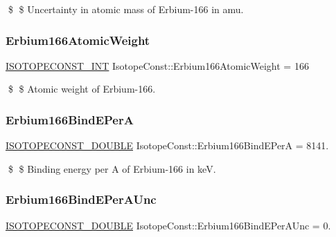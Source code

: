 \$ \$ Uncertainty in atomic mass of Erbium-\/166 in amu. \mbox{\label{group___isotope_const-_erbium-_er166_ga8fb1ef5299fd2909bfe9fede91c3a0c9}} 
\subsubsection{\texorpdfstring{Erbium166\+Atomic\+Weight}{Erbium166AtomicWeight}}
{\footnotesize\ttfamily \mbox{\hyperlink{group___isotope_const-_macros_ga5f18360b3e99483a35c32d789e62621c}{I\+S\+O\+T\+O\+P\+E\+C\+O\+N\+S\+T\+\_\+\+I\+NT}} Isotope\+Const\+::\+Erbium166\+Atomic\+Weight = 166}

\$ \$ Atomic weight of Erbium-\/166. \mbox{\label{group___isotope_const-_erbium-_er166_gacd64d0ea745dfdd40eb74ee2764c8688}} 
\subsubsection{\texorpdfstring{Erbium166\+Bind\+E\+PerA}{Erbium166BindEPerA}}
{\footnotesize\ttfamily \mbox{\hyperlink{group___isotope_const-_macros_ga8f45a7272ce02c0b4c65c44636ed719a}{I\+S\+O\+T\+O\+P\+E\+C\+O\+N\+S\+T\+\_\+\+D\+O\+U\+B\+LE}} Isotope\+Const\+::\+Erbium166\+Bind\+E\+PerA = 8141.}

\$ \$ Binding energy per A of Erbium-\/166 in keV. \mbox{\label{group___isotope_const-_erbium-_er166_ga42ca8eca0fe8b4b1a96c4f6c265a15d1}} 
\subsubsection{\texorpdfstring{Erbium166\+Bind\+E\+Per\+A\+Unc}{Erbium166BindEPerAUnc}}
{\footnotesize\ttfamily \mbox{\hyperlink{group___isotope_const-_macros_ga8f45a7272ce02c0b4c65c44636ed719a}{I\+S\+O\+T\+O\+P\+E\+C\+O\+N\+S\+T\+\_\+\+D\+O\+U\+B\+LE}} Isotope\+Const\+::\+Erbium166\+Bind\+E\+Per\+A\+Unc = 0.}

